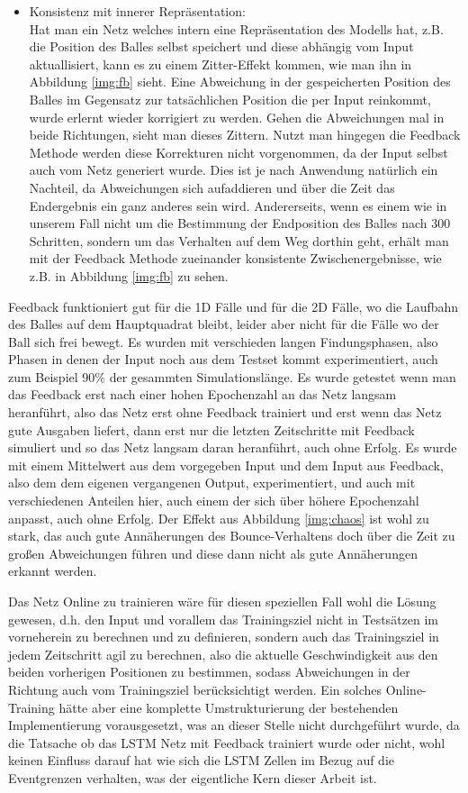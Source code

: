 \begin{description}
\begin{itemize}
		\item Konsistenz mit innerer Repräsentation: \hfill \\
		 Hat man ein Netz welches intern eine Repräsentation des Modells hat, z.B. die Position des Balles selbst speichert und diese abhängig vom Input aktuallisiert, kann es zu einem Zitter-Effekt kommen, wie man ihn in Abbildung \ref{img:fb} sieht. Eine Abweichung in der gespeicherten Position des Balles im Gegensatz zur tatsächlichen Position die per Input reinkommt, wurde erlernt wieder korrigiert zu werden. Gehen die Abweichungen mal in beide Richtungen, sieht man dieses Zittern. Nutzt man hingegen die Feedback Methode werden diese Korrekturen nicht vorgenommen, da der Input selbst auch vom Netz generiert wurde. Dies ist je nach Anwendung natürlich ein Nachteil, da Abweichungen sich aufaddieren und über die Zeit das Endergebnis ein ganz anderes sein wird. Andererseits, wenn es einem wie in unserem Fall nicht um die Bestimmung der Endposition des Balles nach 300 Schritten, sondern um das Verhalten auf dem Weg dorthin geht, erhält man mit der Feedback Methode zueinander konsistente Zwischenergebnisse, wie z.B. in Abbildung \ref{img:fb} zu sehen.
	\end{itemize}
	Feedback funktioniert gut für die 1D Fälle und für die 2D Fälle, wo die Laufbahn des Balles auf dem Hauptquadrat bleibt, leider aber nicht für die Fälle wo der Ball sich frei bewegt. Es wurden mit verschieden langen Findungsphasen, also Phasen in denen der Input noch aus dem Testset kommt experimentiert, auch zum Beispiel 90\% der gesammten Simulationslänge. Es wurde getestet wenn man das Feedback erst nach einer hohen Epochenzahl an das Netz langsam heranführt, also das Netz erst ohne Feedback trainiert und erst wenn das Netz gute Ausgaben liefert, dann erst nur die letzten Zeitschritte mit Feedback simuliert und so das Netz langsam daran heranführt, auch ohne Erfolg. Es wurde mit einem Mittelwert aus dem vorgegeben Input und dem Input aus Feedback, also dem dem eigenen vergangenen Output, experimentiert, und auch mit verschiedenen Anteilen hier, auch einem der sich über höhere Epochenzahl anpasst, auch ohne Erfolg. Der Effekt aus Abbildung \ref{img:chaos} ist wohl zu stark, das auch gute Annäherungen des Bounce-Verhaltens doch über die Zeit zu großen Abweichungen führen und diese dann nicht als gute Annäherungen erkannt werden. 
	
	Das Netz Online zu trainieren wäre für diesen speziellen Fall wohl die Lösung gewesen, d.h. den Input und vorallem das Trainingsziel nicht in Testsätzen im vorneherein zu berechnen und zu definieren, sondern auch das Trainingsziel in jedem Zeitschritt agil zu berechnen, also die aktuelle Geschwindigkeit aus den beiden vorherigen Positionen zu bestimmen, sodass Abweichungen in der Richtung auch vom Trainingsziel berücksichtigt werden. Ein solches Online-Training hätte aber eine komplette Umstrukturierung der bestehenden Implementierung vorausgesetzt, was an dieser Stelle nicht durchgeführt wurde, da die Tatsache ob das LSTM Netz mit Feedback trainiert wurde oder nicht, wohl keinen Einfluss darauf hat wie sich die LSTM Zellen im Bezug auf die Eventgrenzen verhalten, was der eigentliche Kern dieser Arbeit ist. 
\end{description}

